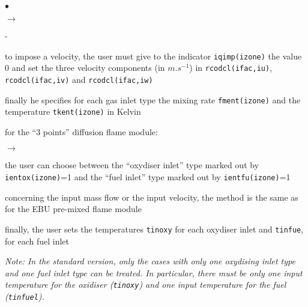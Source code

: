 {{\begin{list}{$\bullet$}{}
\begin{list}{$\rightarrow$}{}
\begin{list}{-}{}
                                 \item to impose a velocity, the user
                                       must give to the indicator
                                       \texttt{iqimp(izone)} the value 0 and set
                                       the three velocity components (in
                                       $m.s^{-1}$) in
                                       \texttt{rcodcl(ifac,iu)},
                                       \texttt{rcodcl(ifac,iv)} and
                                       \texttt{rcodcl(ifac,iw)}
                          \end{list}
                    \item finally he specifies for each gas inlet type
                          the mixing rate \texttt{fment(izone)} and
                          the temperature \texttt{tkent(izone)} in Kelvin
             \end{list}

       \item for the ``3 points'' diffusion flame module:
             \begin{list}{$\rightarrow$}{}
                    \item the user can choose between the ``oxydiser
                          inlet'' type marked out by
                          \texttt{ientox(izone)}=1 and the ``fuel
                          inlet'' type marked out by
                          \texttt{ientfu(izone)}=1
                    \item concerning the input mass flow or the input
                          velocity, the method is the same as for the
                          EBU pre-mixed flame module
                    \item finally, the user sets the temperatures
                          \texttt{tinoxy} for each oxydiser inlet
                          and \texttt{tinfue}, for each fuel inlet

{\em Note: In the standard version, only the cases with only one
                          oxydising inlet type and one fuel inlet type
                          can be treated. In particular, there must be
                          only one input temperature for the oxidiser
                          (\texttt{tinoxy}) and one input temperature for the
                          fuel (\texttt{tinfuel}).}
             \end{list}


\end{list}}}
